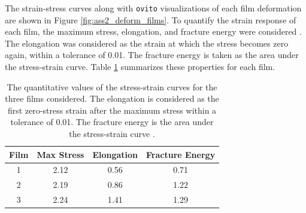 \documentclass[10pt,a4paper]{labreport}
\begin{document}
The strain-stress curves along with \texttt{ovito} visualizations of each film deformation are shown in Figure \ref{fig:ass2_deform_films}. 
To quantify the strain response of each film, the maximum stress, elongation, and fracture energy were considered \cite{zhangUnderstandingCavitationCrazing2020}. 
The elongation was considered as the strain at which the stress becomes zero again, within a tolerance of 0.01. 
The fracture energy is taken as the area under the stress-strain curve. 
Table \ref{tab:ass2_film_props} summarizes these properties for each film. 
\begin{table}[h]
  \centering
  \caption{The quantitative values of the stress-strain curves for the three films considered. The elongation is considered as the first zero-stress strain after the maximum stress within a tolerance of 0.01. The fracture energy is the area under the stress-strain curve \cite{zhangUnderstandingCavitationCrazing2020}.}
  \begin{tabular}{cccc}
    \hline
    \textbf{Film} & \textbf{Max Stress} & \textbf{Elongation} & \textbf{Fracture Energy} \\ \hline
    1 & 2.12 & 0.56 & 0.71 \\
    2 & 2.19 & 0.86 & 1.22 \\
    3 & 2.24 & 1.41 & 1.29 \\
    \hline
  \end{tabular}
  \label{tab:ass2_film_props}
\end{table}
\end{document}
